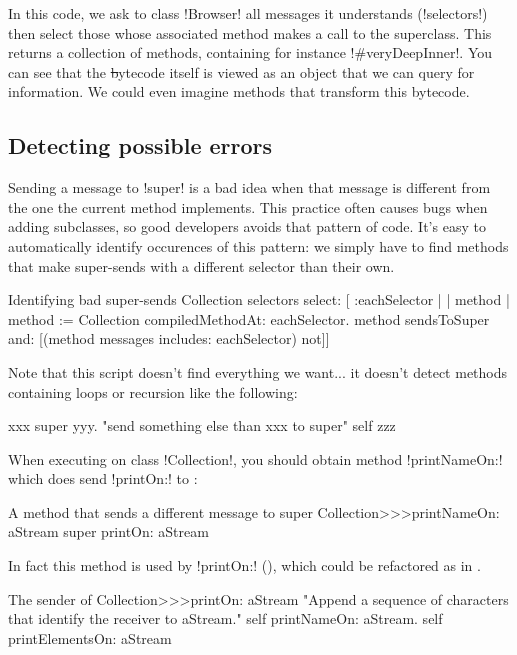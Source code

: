 \documentclass[a4paper,10pt,twoside]{book}
\begin{document}
In this code, we ask to class \ct!Browser! all messages it understands (\ct!selectors!) then select those whose associated method makes a call to the superclass.
This returns a collection of methods, containing for instance \ct!#veryDeepInner!.
You can see that the \st bytecode itself is viewed as an object that we can query for information.
We could even imagine methods that transform this bytecode.

\subsection{Detecting possible errors}

Sending a message to \ct!super! is a bad idea when that message is different from the one the current method implements.
This practice often causes bugs when adding subclasses, so good developers avoids that pattern of code.
It's easy to automatically identify occurences of this pattern: we simply have to find methods that make super-sends with a different selector than their own.

\begin{script}[findSuperSends]{Identifying bad super-sends}
Collection selectors select: [ :eachSelector |
	| method |
	method := Collection compiledMethodAt: eachSelector.
	method sendsToSuper and: [(method messages includes: eachSelector) not]]
\end{script}

Note that this script doesn't find everything we want... it doesn't detect methods containing loops or recursion like the following:
\begin{code}{}
xxx
	super yyy. "send something else than xxx to super"
	self zzz
\end{code}

When executing  on class \ct!Collection!, you should obtain method \ct!printNameOn:! which does send \ct!printOn:! to \super:
\begin{method}[printNameOn]{A method that sends a different message to super}
Collection>>>printNameOn: aStream
	super printOn: aStream
\end{method}

In fact this method is used by \ct!printOn:! (), which could be refactored as in .

\begin{method}[oldPrintOn]{The sender of }
Collection>>>printOn: aStream
	"Append a sequence of characters that identify the receiver to aStream."
	self printNameOn: aStream.
	self printElementsOn: aStream
\end{method}
\end{document}
